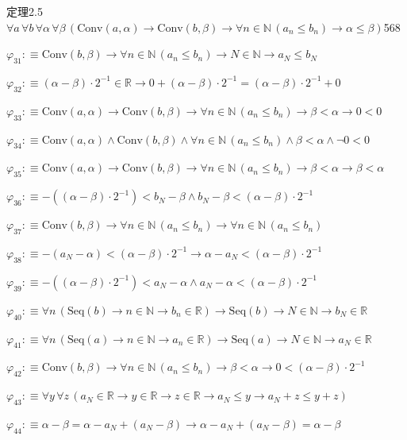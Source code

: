 \begin{fullproof}{定理2.5}{$\forall a\,\forall b\,\forall \alpha\,\forall \beta\,(\mathrm{Conv}(a,\alpha) \to \mathrm{Conv}(b,\beta) \to \forall n \in \mathbb{N}\,(a_{n} \leq b_{n}) \to \alpha \leq \beta)$}{568}
\begin{abbrevlist}
\item $\varphi_{31} :\equiv \mathrm{Conv}(b,\beta) \to \forall n \in \mathbb{N}\,(a_{n} \leq b_{n}) \to N \in \mathbb{N} \to a_{N} \leq b_{N}$
\item $\varphi_{32} :\equiv (\alpha - \beta) \cdot 2^{-1} \in \mathbb{R} \to 0 + (\alpha - \beta) \cdot 2^{-1} = (\alpha - \beta) \cdot 2^{-1} + 0$
\item $\varphi_{33} :\equiv \mathrm{Conv}(a,\alpha) \to \mathrm{Conv}(b,\beta) \to \forall n \in \mathbb{N}\,(a_{n} \leq b_{n}) \to \beta < \alpha \to 0 < 0$
\item $\varphi_{34} :\equiv \mathrm{Conv}(a,\alpha) \land \mathrm{Conv}(b,\beta) \land \forall n \in \mathbb{N}\,(a_{n} \leq b_{n}) \land \beta < \alpha \land \neg 0 < 0$
\item $\varphi_{35} :\equiv \mathrm{Conv}(a,\alpha) \to \mathrm{Conv}(b,\beta) \to \forall n \in \mathbb{N}\,(a_{n} \leq b_{n}) \to \beta < \alpha \to \beta < \alpha$
\item $\varphi_{36} :\equiv -((\alpha - \beta) \cdot 2^{-1}) < b_{N} - \beta \land b_{N} - \beta < (\alpha - \beta) \cdot 2^{-1}$
\item $\varphi_{37} :\equiv \mathrm{Conv}(b,\beta) \to \forall n \in \mathbb{N}\,(a_{n} \leq b_{n}) \to \forall n \in \mathbb{N}\,(a_{n} \leq b_{n})$
\item $\varphi_{38} :\equiv -(a_{N} - \alpha) < (\alpha - \beta) \cdot 2^{-1} \to \alpha - a_{N} < (\alpha - \beta) \cdot 2^{-1}$
\item $\varphi_{39} :\equiv -((\alpha - \beta) \cdot 2^{-1}) < a_{N} - \alpha \land a_{N} - \alpha < (\alpha - \beta) \cdot 2^{-1}$
\item $\varphi_{40} :\equiv \forall n\,(\mathrm{Seq}(b) \to n \in \mathbb{N} \to b_{n} \in \mathbb{R}) \to \mathrm{Seq}(b) \to N \in \mathbb{N} \to b_{N} \in \mathbb{R}$
\item $\varphi_{41} :\equiv \forall n\,(\mathrm{Seq}(a) \to n \in \mathbb{N} \to a_{n} \in \mathbb{R}) \to \mathrm{Seq}(a) \to N \in \mathbb{N} \to a_{N} \in \mathbb{R}$
\item $\varphi_{42} :\equiv \mathrm{Conv}(b,\beta) \to \forall n \in \mathbb{N}\,(a_{n} \leq b_{n}) \to \beta < \alpha \to 0 < (\alpha - \beta) \cdot 2^{-1}$
\item $\varphi_{43} :\equiv \forall y\,\forall z\,(a_{N} \in \mathbb{R} \to y \in \mathbb{R} \to z \in \mathbb{R} \to a_{N} \leq y \to a_{N} + z \leq y + z)$
\item $\varphi_{44} :\equiv \alpha - \beta = \alpha - a_{N} + (a_{N} - \beta) \to \alpha - a_{N} + (a_{N} - \beta) = \alpha - \beta$

\end{abbrevlist}
\end{fullproof}
